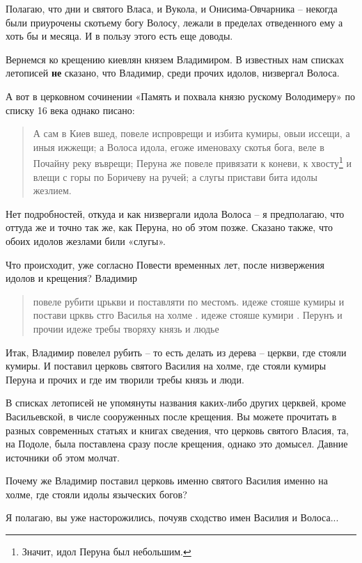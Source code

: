 \documentclass[a5paper,11pt,openany]{article}
\begin{document}
   Полагаю, что дни и святого Власа, и Вукола, и Онисима-Овчарника – некогда были приурочены скотьему богу Волосу, лежали в пределах отведенного ему а хоть бы и месяца. И в пользу этого есть еще доводы.

   Вернемся ко крещению киевлян князем Владимиром. В известных нам списках летописей \textbf{не} сказано, что Владимир, среди прочих идолов, низвергал Волоса.

  А вот в церковном сочинении «Память и похвала князю рускому Володимеру» по списку 16 века однако писано:

\begin{quotation}
\noindent А сам в Киев вшед, повеле испроврещи и избита кумиры, овыи иссещи, а иныя ижжещи; а Волоса идола, егоже именоваху скотья бога, веле в Почайну реку въврещи; Перуна же повеле привязати к коневи, к хвосту\footnote{Значит, идол Перуна был небольшим.} и влещи с горы по Боричеву на ручей; а слугы пристави бита идолы жезлием.
\end{quotation}

   Нет подробностей, откуда и как низвергали идола Волоса – я предполагаю, что оттуда же и точно так же, как Перуна, но об этом позже. Сказано также, что обоих идолов жезлами били «слугы».

    Что происходит, уже согласно Повести временных лет, после низвержения идолов и крещения? Владимир 

\begin{quotation}
\noindent повеле рубити црькви и поставляти по местомъ. идеже стояше кумиры и постави црквь стго Василья на холме . идеже стояше кумири . Перунъ и прочии идеже требы творяху князь и людье
\end{quotation}

Итак, Владимир повелел рубить – то есть делать из дерева – церкви, где стояли кумиры. И поставил церковь святого Василия на холме, где стояли кумиры Перуна и прочих и где им творили требы князь и люди.

  В списках летописей не упомянуты названия каких-либо других церквей, кроме Васильевской, в числе сооруженных после крещения. Вы можете прочитать в разных современных статьях и книгах сведения, что церковь святого Власия, та, на Подоле, была поставлена сразу после крещения, однако это домысел. Давние источники об этом молчат.

  Почему же Владимир поставил церковь именно святого Василия именно на холме, где стояли идолы языческих богов?

   Я полагаю, вы уже насторожились, почуяв сходство имен Василия и Волоса...
\end{document}
